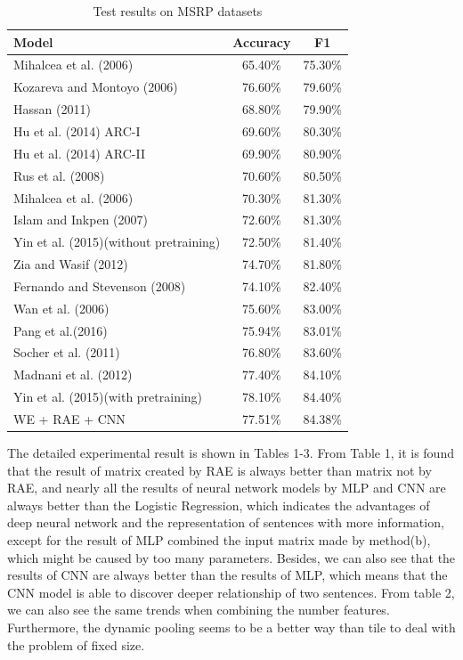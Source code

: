 \documentclass[conference]{IEEEtran}
\begin{document}
\begin{table}[!t]
	\center
	\caption{Test results on MSRP datasets}
	\begin{tabular}{|l|c|c|} \hline
		Model                          & Accuracy   & F1      \\ \hline
		Mihalcea et al. (2006)         & 65.40\%	& 75.30\% \\ \hline
		Kozareva and Montoyo (2006)	   & 76.60\%	& 79.60\% \\ \hline
		Hassan (2011)	               & 68.80\%	& 79.90\% \\ \hline
		Hu et al. (2014) ARC-I	       & 69.60\% 	& 80.30\%  \\ \hline
		Hu et al. (2014) ARC-II	       & 69.90\% 	& 80.90\%  \\ \hline
		Rus et al. (2008)	           & 70.60\%	& 80.50\% \\ \hline
		Mihalcea et al. (2006)	       & 70.30\%	& 81.30\% \\ \hline
		Islam and Inkpen (2007)	       & 72.60\%	& 81.30\% \\ \hline
		Yin et al. (2015)(without pretraining)	& 72.50\% &	81.40\% \\ \hline
		Zia and Wasif (2012)	       & 74.70\%	& 81.80\% \\ \hline
		Fernando and Stevenson (2008)  & 74.10\%	& 82.40\% \\ \hline
		Wan et al. (2006)	           & 75.60\%	& 83.00\% \\ \hline
        Pang et al.(2016)              & 75.94\%    & 83.01\% \\ \hline
		Socher et al. (2011)	       & 76.80\%	& 83.60\% \\ \hline
		Madnani et al. (2012)	       & 77.40\%	    & 84.10\%  \\ \hline
		Yin et al. (2015)(with pretraining)	& 78.10\% &	84.40\% \\ \hline
		WE + RAE + CNN	               & 77.51\%	& 84.38\% \\ \hline
	\end{tabular}
	\label{tb1}
\end{table}

The detailed experimental result is shown in Tables 1-3. From Table 1, it is found that the result of matrix created by RAE is always better than matrix not by RAE, and nearly all the results of neural network models by MLP and CNN are always better than the Logistic Regression, which indicates the advantages of deep neural network and the representation of sentences with more information, except for the result of MLP combined the input matrix made by method(b), which might be caused by too many parameters. Besides, we can also see that the results of CNN are always better than the results of MLP, which means that the CNN model is able to discover deeper relationship of two sentences. From table 2, we can also see the same trends when combining the number features. Furthermore, the dynamic pooling seems to be a better way than tile to deal with the problem of fixed size.
\end{document}
